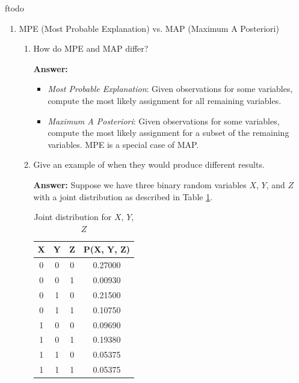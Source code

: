 ƒtodo\documentclass{article}
\newenvironment{QandA}{\begin{enumerate}[label=\arabic*.]}{\end{enumerate}}
\newenvironment{InnerQandA}{\begin{enumerate}[label=\roman*.]}{\end{enumerate}}
\newenvironment{answer}{\par\normalfont \textbf{Answer:}}{}
\begin{document}
\begin{QandA}
\begin{answer}
        (Source: \href{https://en.wikipedia.org/wiki/Kullback%E2%80%93Leibler_divergence}{Wikipedia}, \href{https://ai.stackexchange.com/questions/18019/why-does-the-kl-divergence-not-satisfy-the-triangle-inequality}{StackExchange})
    \end{answer}

    \item MPE (Most Probable Explanation) vs. MAP (Maximum A Posteriori)
    \begin{InnerQandA}
        \item How do MPE and MAP differ?
        \begin{answer}
            \begin{itemize}
                \item \textit{Most Probable Explanation}: Given observations for some variables, compute the most likely assignment for all remaining variables. 
                \item \textit{Maximum A Posteriori}: Given observations for some variables, compute the most likely assignment for a subset of the remaining variables. MPE is a special case of MAP.
            \end{itemize}
        \end{answer}

        \item Give an example of when they would produce different results.
        \begin{answer}
            Suppose we have three binary random variables $X$, $Y$, and $Z$ with a joint distribution as described in Table \ref{tab:joint-binary-vars}.
            \begin{table}[h!]
            \centering
            \begin{tabular}{|c|c|c|c|}
            \hline
            \textbf{X} & \textbf{Y} & \textbf{Z} & \textbf{P(X, Y, Z)} \\ \hline
            0          & 0          & 0          & 0.27000             \\ \hline
            0          & 0          & 1          & 0.00930             \\ \hline
            0          & 1          & 0          & 0.21500             \\ \hline
            0          & 1          & 1          & 0.10750             \\ \hline
            1          & 0          & 0          & 0.09690             \\ \hline
            1          & 0          & 1          & 0.19380             \\ \hline
            1          & 1          & 0          & 0.05375             \\ \hline
            1          & 1          & 1          & 0.05375             \\ \hline
            \end{tabular}
            \caption{Joint distribution for $X$, $Y$, $Z$}
            \label{tab:joint-binary-vars}
            \end{table}


\end{answer}
\end{InnerQandA}
\end{QandA}
\end{document}
